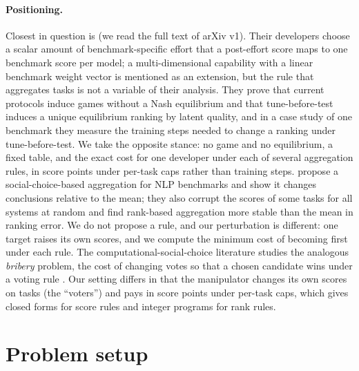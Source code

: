 \documentclass{article}
\begin{document}
\paragraph{Positioning.}
Closest in question is \citet{chen2026incentives} (we read the full text of arXiv v1). Their developers choose a scalar amount of benchmark-specific effort that a post-effort score maps to one benchmark score per model; a multi-dimensional capability with a linear benchmark weight vector is mentioned as an extension, but the rule that aggregates tasks is not a variable of their analysis. They prove that current protocols induce games without a Nash equilibrium and that tune-before-test induces a unique equilibrium ranking by latent quality, and in a case study of one benchmark they measure the training steps needed to change a ranking under tune-before-test. We take the opposite stance: no game and no equilibrium, a fixed table, and the exact cost for one developer under each of several aggregation rules, in score points under per-task caps rather than training steps. \citet{colombo2022best} propose a social-choice-based aggregation for NLP benchmarks and show it changes conclusions relative to the mean; they also corrupt the scores of some tasks for all systems at random and find rank-based aggregation more stable than the mean in ranking error. We do not propose a rule, and our perturbation is different: one target raises its own scores, and we compute the minimum cost of becoming first under each rule. The computational-social-choice literature studies the analogous \emph{bribery} problem, the cost of changing votes so that a chosen candidate wins under a voting rule \citep{faliszewski2009bribery,brandt2016handbook}. Our setting differs in that the manipulator changes its own scores on tasks (the ``voters'') and pays in score points under per-task caps, which gives closed forms for score rules and integer programs for rank rules.

\section{Problem setup}
\label{sec:setup}
\end{document}
